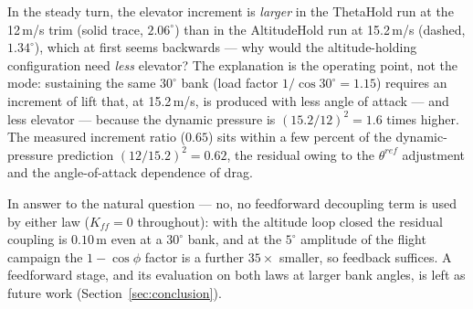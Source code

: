 In the steady turn, the elevator increment is \emph{larger} in the
ThetaHold run at the 12\,m/s trim (solid trace, $2.06^\circ$) than in
the AltitudeHold run at 15.2\,m/s (dashed, $1.34^\circ$), which at
first seems backwards --- why would the altitude-holding
configuration need \emph{less} elevator? The explanation is the
operating point, not the mode: sustaining the same $30^\circ$ bank
(load factor $1/\cos 30^\circ = 1.15$) requires an increment of lift
that, at 15.2\,m/s, is produced with less angle of attack --- and less
elevator --- because the dynamic pressure is $(15.2/12)^2 = 1.6$ times
higher. The measured increment ratio ($0.65$) sits within a few
percent of the dynamic-pressure prediction $(12/15.2)^2 = 0.62$, the
residual owing to the $\theta^{ref}$ adjustment and the
angle-of-attack dependence of drag.

In answer to the natural question --- no, no feedforward decoupling
term is used by either law ($K_{f\!f}=0$ throughout): with the
altitude loop closed the residual coupling is $0.10$\,m even at a
$30^\circ$ bank, and at the $5^\circ$ amplitude of the flight
campaign the $1-\cos\phi$ factor is a further $35\times$ smaller, so
feedback suffices.
A feedforward stage, and its evaluation on both laws at larger bank
angles, is left as future work
(Section~\ref{sec:conclusion}).
